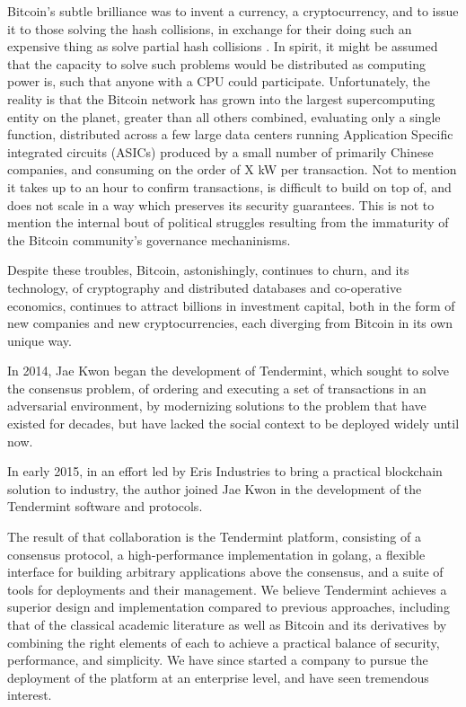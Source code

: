 Bitcoin's subtle brilliance was to invent a currency, a cryptocurrency, and to issue it to those solving the hash collisions, 
in exchange for their doing such an expensive thing as solve partial hash collisions \cite{cost_of_mining}.
In spirit, it might be assumed that the capacity to solve such problems would be distributed as computing power is, 
such that anyone with a CPU could participate.
Unfortunately, the reality is that the Bitcoin network has grown into the largest supercomputing entity on the planet, greater than all others combined,
evaluating only a single function, distributed across a few large data centers running Application Specific integrated circuits (ASICs) produced by a small number of primarily Chinese companies, and consuming on the order of X kW per transaction.
Not to mention it takes up to an hour to confirm transactions, is difficult to build on top of, and does not scale in a way which preserves its security guarantees.
This is not to mention the internal bout of political struggles resulting from the immaturity of the Bitcoin community's governance mechaninisms.

Despite these troubles, Bitcoin, astonishingly, continues to churn,
and its technology, 
of cryptography and distributed databases and co-operative economics,
continues to attract billions in investment capital,
both in the form of new companies and new cryptocurrencies,
each diverging from Bitcoin in its own unique way.

In 2014, Jae Kwon began the development of Tendermint, which sought to solve the consensus problem,
of ordering and executing a set of transactions in an adversarial environment, 
by modernizing solutions to the problem that have existed for decades,
but have lacked the social context to be deployed widely until now.

In early 2015, in an effort led by Eris Industries to bring a practical blockchain solution to industry,
the author joined Jae Kwon in the development of the Tendermint software and protocols.

The result of that collaboration is the Tendermint platform, consisting of a consensus protocol, a high-performance implementation in golang, 
a flexible interface for building arbitrary applications above the consensus, and a suite of tools for deployments and their management.
We believe Tendermint achieves a superior design and implementation compared to previous approaches, 
including that of the classical academic literature \cite{dls,pbft,raft} as well as Bitcoin \cite{bitcoin} and its derivatives \cite{ethereum,sidechains,peercoin}
by combining the right elements of each to achieve a practical balance of security, performance, and simplicity.
We have since started a company to pursue the deployment of the platform at an enterprise level, and have seen tremendous interest.

